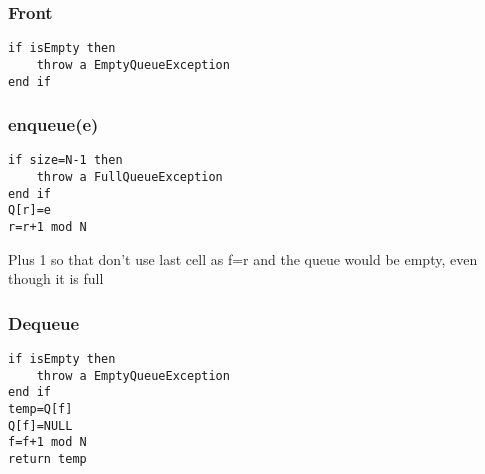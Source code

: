 \documentclass{article}[18pt]
\begin{document}
\subsubsection{Front}
\begin{lstlisting}[mathescape=true]
if isEmpty then
	throw a EmptyQueueException
end if
\end{lstlisting}
\subsubsection{enqueue(e)}
\begin{lstlisting}[mathescape=true]
if size=N-1 then
	throw a FullQueueException
end if
Q[r]=e
r=r+1 mod N
\end{lstlisting}
Plus 1 so that don't use last cell as f=r and the queue would be empty, even though it is full
\subsubsection{Dequeue}
\begin{lstlisting}[mathescape=true]
if isEmpty then
	throw a EmptyQueueException
end if
temp=Q[f]
Q[f]=NULL
f=f+1 mod N
return temp
\end{lstlisting}
\end{document}
